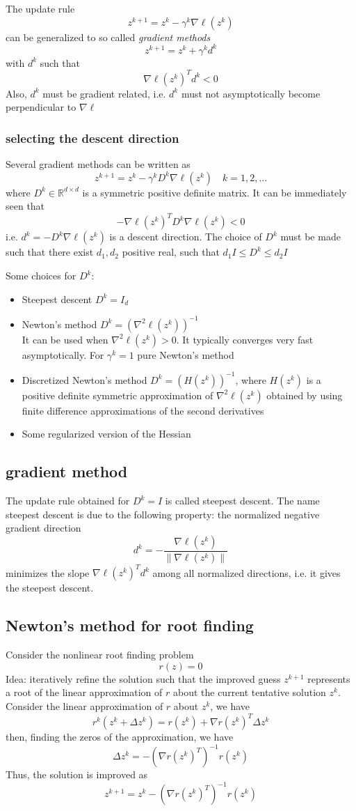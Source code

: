 \documentclass[openany]{book}
\newcommand{\R}{\mathbb{R}} %
\theoremstyle{definition}
\theoremstyle{remark}
\begin{document}
The update rule 
\[
    z^{k+1}=z^k-\gamma^k\nabla\ell(z^k)
\]
can be generalized to so called \emph{gradient methods}
\[
    z^{k+1}=z^k+\gamma^kd^k
\]
with $d^k$ such that
\[
    \nabla\ell(z^k)^Td^k<0
\]
Also, $d^k$ must be gradient related, i.e. $d^k$ must not asymptotically become perpendicular to $\nabla\ell$
\subsubsection{selecting the descent direction}
Several gradient methods can be written as 
\[
    z^{k+1} = z^k-\gamma^kD^k\nabla\ell(z^k) \quad k=1,2,\dots
\]
where $D^k\in\R^{d\times d}$ is  a symmetric positive definite matrix. It can be immediately seen that 
\[
    -\nabla\ell(z^k)^TD^k\nabla\ell(z^k)<0
\]
i.e. $d^k = -D^k\nabla\ell(z^k)$ is a descent direction. The choice of $D^k$ must be made such that there exist $d_1,d_2$ positive real, such that $d_1 I \leq D^k \leq d_2 I$

Some choices for $D^k$:
\begin{itemize}
    \item Steepest descent $D^k=I_d$
    \item Newton's method $D^k = (\nabla^2\ell(z^k))^{-1}$\\
        It can be used when $\nabla^2\ell(z^k)>0$. It typically converges very fast asymptotically. For $\gamma^k = 1$ pure Newton's method
    \item Discretized Newton's method $D^k=(H(z^k))^{-1}$, where $H(z^k)$ is a positive definite symmetric approximation of $\nabla^2\ell(z^k)$ obtained by using finite difference approximations of the second derivatives 
    \item Some regularized version of the Hessian
\end{itemize}
\subsection{gradient method}
The update rule obtained for $D^k=I$ is called steepest descent. The name steepest descent is due to the following property: the normalized negative gradient direction 
\[
    d^k = -\displaystyle\frac{\nabla\ell(z^k)}{\|\nabla\ell(z^k)\|}
\]
minimizes the slope $\nabla \ell(z^k)^Td^k$ among all normalized directions, i.e. it gives the steepest descent.

\subsection{Newton's method for root finding}
Consider the nonlinear root finding problem 
\[
    r(z) = 0
\]
Idea: iteratively refine the solution such that the improved guess $z^{k+1}$ represents a root of the linear approximation of $r$ about the current tentative solution $z^k$. Consider the linear approximation of $r$ about $z^k$, we have 
\[
    r^k(z^k+\Delta z^k) = r(z^k)+\nabla r(z^k)^T\Delta z^k
\]
then, finding the zeros of the approximation, we have
\[
    \Delta z^k = -(\nabla r(z^k)^T)^{-1}r(z^k)
\]
Thus, the solution is improved as 
\[
    z^{k+1} = z^k-(\nabla r(z^k)^T)^{-1}r(z^k)
\]
\end{document}
